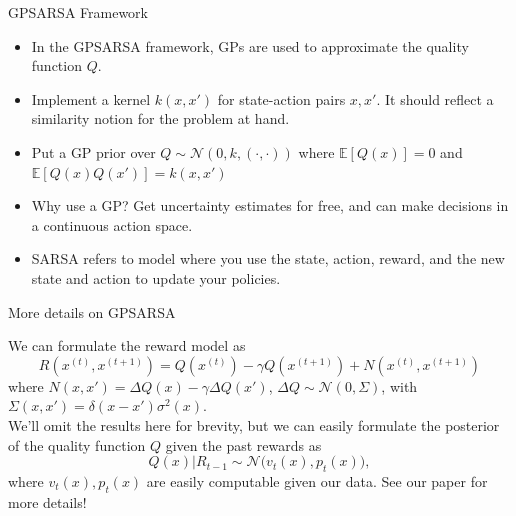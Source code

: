 \documentclass{beamer}
\begin{document}
\begin{frame}{GPSARSA Framework \cite{engel}}
\begin{itemize}
\item In the GPSARSA framework, GPs are used to approximate the quality function $Q$.

\item Implement a kernel $k(x,x')$ for state-action pairs $x, x'$. It should reflect a similarity notion for the problem at hand.

\item Put a GP prior over $Q\sim \mathcal{N}(0, k,(\cdot, \cdot))$ where $\mathbb{E}[Q(x)] = 0$ and $\mathbb{E}[Q(x)Q(x')] = k(x, x')$

\item Why use a GP? Get uncertainty estimates for free, and can make decisions in a continuous action space.
\item SARSA refers to model where you use the state, action, reward, and the new state and action to update your policies.
\end{itemize}
\end{frame}

\begin{frame}{More details on GPSARSA \cite{engel}}

We can formulate the reward model as
\begin{equation*}
R(x^{(t)}, x^{(t+1)}) = Q(x^{(t)}) - \gamma Q(x^{(t+1)}) + N(x^{(t)}, x^{(t+1)})
\end{equation*}
where $N(x, x') = \Delta Q(x) - \gamma \Delta Q(x')$, $\Delta Q \sim \mathcal{N}(0,\Sigma)$,
with $\Sigma(x, x') = \delta(x - x')\sigma^2(x)$.
\[ \]
We'll omit the results here for brevity, but we can easily formulate the posterior of the quality function $Q$ given the past rewards as
\begin{equation}
Q(x)|R_{t-1} \sim \mathcal{N}\big(v_t(x), p_t(x)\big),
\end{equation}
where $v_t(x), p_t(x)$ are easily computable given our data. See our paper for more details!
\end{frame}
\end{document}
